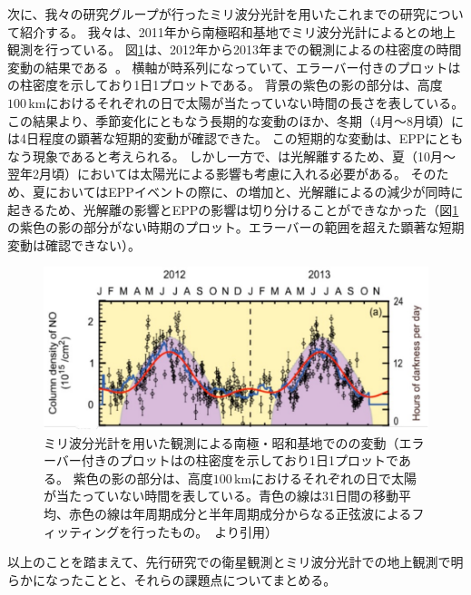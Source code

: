 次に、我々の研究グループが行ったミリ波分光計を用いたこれまでの研究について紹介する。
我々は、2011年から南極昭和基地でミリ波分光計によるとの地上観測を行っている。
図\ref{fig:isono2014ground_fig5a}は、2012年から2013年までの観測によるの柱密度の時間変動の結果である~\cite{isono2014ground}。
横軸が時系列になっていて、エラーバー付きのプロットはの柱密度を示しており1日1プロットである。
背景の紫色の影の部分は、高度$100\, \mathrm{km}$におけるそれぞれの日で太陽が当たっていない時間の長さを表している。
この結果より、季節変化にともなう長期的な変動のほか、冬期（4月〜8月頃）には4日程度の顕著な短期的変動が確認できた。
この短期的な変動は、EPPにともなう現象であると考えられる。
しかし一方で、は光解離するため、夏（10月〜翌年2月頃）においては太陽光による影響も考慮に入れる必要がある。
そのため、夏においてはEPPイベントの際に、の増加と、光解離によるの減少が同時に起きるため、光解離の影響とEPPの影響は切り分けることができなかった（図\ref{fig:isono2014ground_fig5a}の紫色の影の部分がない時期のプロット。エラーバーの範囲を超えた顕著な短期変動は確認できない）。
\begin{figure}[htbp]
    \centering
    \includegraphics[width=\linewidth]{master_thesis_contents/master_thesis_fig/isono2014ground_fig5a.pdf}
    \caption{ミリ波分光計を用いた観測による南極・昭和基地でのの変動（エラーバー付きのプロットはの柱密度を示しており1日1プロットである。
    紫色の影の部分は、高度$100\, \mathrm{km}$におけるそれぞれの日で太陽が当たっていない時間を表している。青色の線は31日間の移動平均、赤色の線は年周期成分と半年周期成分からなる正弦波によるフィッティングを行ったもの。~\cite{isono2014ground}より引用）}
    \label{fig:isono2014ground_fig5a}
\end{figure}
以上のことを踏まえて、先行研究での衛星観測とミリ波分光計での地上観測で明らかになったことと、それらの課題点についてまとめる。
\clearpage
